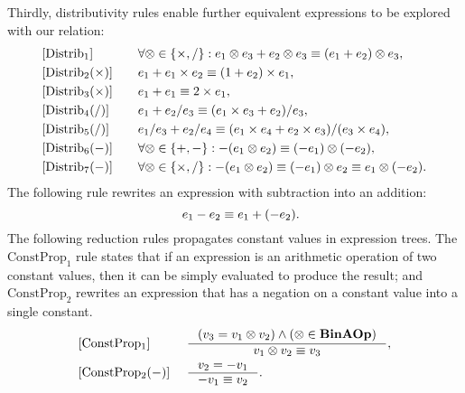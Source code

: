 Thirdly, distributivity rules enable further equivalent expressions to be
explored with our relation:
\begin{equation}
    \begin{aligned}{}
        & [\mathrm{Distrib}_1] & \quad &
            \forall \otimes \in \{ \times, / \}:
            e_1 \otimes e_3 + e_2 \otimes e_3
            \equiv (e_1 + e_2) \otimes e_3, \\
        & [\mathrm{Distrib}_2 (\times)] & \quad &
            e_1 + e_1 \times e_2 \equiv (1 + e_2) \times e_1, \\
        & [\mathrm{Distrib}_3 (\times)] & \quad &
            e_1 + e_1 \equiv 2 \times e_1, \\
        & [\mathrm{Distrib}_4 (/)] & \quad &
            e_1 + e_2 / e_3 \equiv (e_1 \times e_3 + e_2) / e_3, \\
        & [\mathrm{Distrib}_5 (/)] & \quad &
            e_1 / e_3 + e_2 / e_4 \equiv
            (e_1 \times e_4 + e_2 \times e_3) / (e_3 \times e_4), \\
        & [\mathrm{Distrib}_6 (-)] & \quad &
            \forall \otimes \in \{ +, - \}:
            -(e_1 \otimes e_2) \equiv (-e_1) \otimes (-e_2), \\
        & [\mathrm{Distrib}_7 (-)] & \quad &
            \forall \otimes \in \{ \times, / \}:
            -(e_1 \otimes e_2)
            \equiv (-e_1) \otimes e_2 \equiv e_1 \otimes (-e_2).
    \end{aligned}
\end{equation}
The following rule rewrites an expression with subtraction into an addition:
\begin{equation}
    [\mathrm{Subtract}] \quad
    e_1 - e_2 \eqrel e_1 + (-e_2).
\end{equation}
The following reduction rules propagates constant values in expression
trees. The $\mathrm{ConstProp}_1$ rule states that if an expression is an
arithmetic operation of two constant values, then it can be simply evaluated to
produce the result; and $\mathrm{ConstProp}_2$ rewrites an expression that has
a negation on a constant value into a single constant.
\begin{equation}
    \begin{aligned}{}
        & [\mathrm{ConstProp_1}] &~&
        \inference{%
            (v_3 = v_1 \opsymbol v_2) \wedge
            (\opsymbol \in \binaopset)
        }{%
            v_1 \opsymbol v_2 \eqrel v_3
        }, \\
        & [\mathrm{ConstProp_2} (-)] &~&
        \inference{%
            v_2 = -v_1
        }{%
            -v_1 \eqrel v_2
        }.
    \end{aligned}
    \label{so:eq:constant_propagation}
\end{equation}
